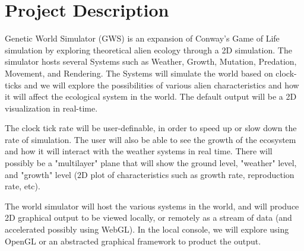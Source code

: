 \chapter*{Project Description}
Genetic World Simulator (GWS) is an expansion of Conway's Game of Life simulation by exploring theoretical alien ecology through a 2D simulation. The simulator hosts several Systems such as Weather, Growth, Mutation, Predation, Movement, and Rendering. The Systems will simulate the world based on clock-ticks and we will explore the possibilities of various alien characteristics and how it will affect the ecological system in the world. The default output will be a 2D visualization in real-time.

The clock tick rate will be user-definable, in order to speed up or slow down the rate of simulation. The user will also be able to see the growth of the ecosystem and how it will interact with the weather systems in real time. There will possibly be a "multilayer" plane that will show the ground level, "weather" level, and "growth" level (2D plot of characteristics such as growth rate, reproduction rate, etc).

The world simulator will host the various systems in the world, and will produce 2D graphical output to be viewed locally, or remotely as a stream of data (and accelerated possibly using WebGL). In the local console, we will explore using OpenGL or an abstracted graphical framework to product the output.